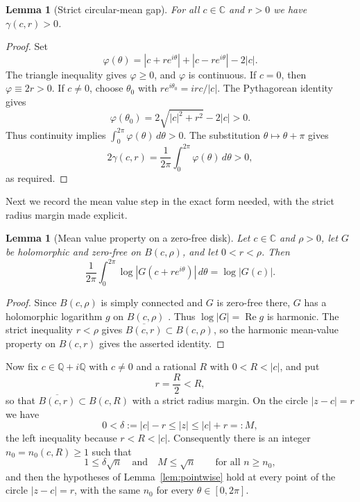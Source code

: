 \documentclass[plain]{baustms}
\newcommand{\C}{\mathbb C}
\newcommand{\Q}{\mathbb Q}
\newcommand{\Real}{\operatorname{Re}}
\theoremstyle{cupthm}
\newtheorem{lemma}[theorem]{Lemma}
\begin{document}
\begin{lemma}[Strict circular-mean gap]\label{lem:gap}
For all $c\in\C$ and $r>0$ we have $\gamma(c,r)>0$.
\end{lemma}

\begin{proof}
Set
\[
 \varphi(\theta)=|c+re^{i\theta}|+|c-re^{i\theta}|-2|c|.
\]
The triangle inequality gives $\varphi\geq0$, and $\varphi$ is continuous. If
$c=0$, then $\varphi\equiv2r>0$. If $c\neq0$, choose $\theta_0$ with
$re^{i\theta_0}=irc/|c|$. The Pythagorean identity gives
\[
 \varphi(\theta_0)=2\sqrt{|c|^2+r^2}-2|c|>0.
\]
Thus continuity implies
$\int_0^{2\pi}\varphi(\theta)\,d\theta>0$. The substitution
$\theta\mapsto\theta+\pi$ gives
\[
 2\gamma(c,r)
 =\frac1{2\pi}\int_0^{2\pi}\varphi(\theta)\,d\theta>0,
\]
as required.
\end{proof}

Next we record the mean value step in the exact form needed, with the strict
radius margin made explicit.

\begin{lemma}[Mean value property on a zero-free disk]\label{lem:mvp}
Let $c\in\C$ and $\rho>0$, let $G$ be holomorphic and zero-free on
$B(c,\rho)$, and let $0<r<\rho$. Then
\[
 \frac1{2\pi}\int_0^{2\pi}\log|G(c+re^{i\theta})|\,d\theta=\log|G(c)|.
\]
\end{lemma}

\begin{proof}
Since $B(c,\rho)$ is simply connected and $G$ is zero-free there, $G$ has a
holomorphic logarithm $g$ on $B(c,\rho)$ \cite[Chapter~IV]{Conway}. Thus
$\log|G|=\Real g$ is harmonic. The strict inequality $r<\rho$ gives
$\overline{B(c,r)}\subset B(c,\rho)$, so the harmonic mean-value property on
$B(c,r)$ gives the asserted identity.
\end{proof}

Now fix $c\in\Q+i\Q$ with $c\neq0$ and a rational $R$ with $0<R<|c|$, and put
\begin{equation}\label{eq:margin}
 r=\frac R2<R,
\end{equation}
so that $\overline{B(c,r)}\subset B(c,R)$ with a strict radius margin. On the
circle $|z-c|=r$ we have
\[
 0<\delta:=|c|-r\leq|z|\leq|c|+r=:M,
\]
the left inequality because $r<R<|c|$. Consequently there is an integer
$n_0=n_0(c,R)\geq1$ such that
\begin{equation}\label{eq:largen}
 1\leq\delta\sqrt n\quad\text{and}\quad M\leq\sqrt n
 \qquad\text{for all }n\geq n_0,
\end{equation}
and then the hypotheses of Lemma~\ref{lem:pointwise} hold at every point of
the circle $|z-c|=r$, with the same $n_0$ for every $\theta\in[0,2\pi]$.
\end{document}
